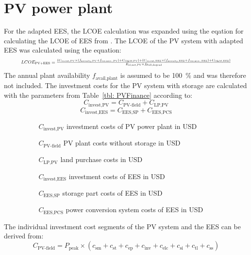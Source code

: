 \section{PV power plant}
For the adapted EES, the LCOE calculation was expanded using the eqation for calculating the LCOE of EES from \cite{Corcuera2015}. The LCOE of the PV system with adapted EES was calculated using the equation:  
\begin{equation}
\resizebox{0.9\textwidth}{!}{$LCOE_{\text{PV+EES}}=\frac{(C_{\text{invest,PV}}\times(f_{\text{annuity,PV}}+f_{\text{ins.ann.,PV}})+C_{\text{O\&M,PV}})+(C_{\text{invest,EES}}\times(f_{\text{annuity,EES}}+f_{\text{ins.ann.,EES}})+C_{\text{O\&M,EES}})}{E_{\text{el,net,PV}} \times f_{\text{Full,degrad}}}$}\label{eq:LCOE_PV}
\end{equation}
The annual plant availability $f_{\text{avail,plant}}$ is assumed to be 100~\% and was therefore not included. The investment costs for the PV system with storage are calculated with the parameters from Table~\ref{tbl: PVFinance} according to:
\begin{equation}
C_{\text{invest,PV}} = C_{\text{PV-field}}+C_{\text{LP,PV}}
\end{equation} 
\begin{equation}
C_{\text{invest,EES}} = C_{\text{EES,SP}}+C_{\text{EES,PCS}}
\end{equation} 
\begin{itemize}
\item[ ] 
\begin{itemize}
\item[ ] 
\begin{itemize}
\item[$C_{\text{invest,PV}}$]investment costs of PV power plant in USD
\item[$C_{\text{PV-field}}$]PV plant costs without storage in USD
\item[$C_{\text{LP,PV}}$]land purchase costs in USD
\item[$C_{\text{invest,EES}}$]investment costs of EES in USD
\item[$C_{\text{EES,SP}}$]storage part costs of EES in USD
\item[$C_{\text{EES,PCS}}$]power conversion system costs of EES in USD
\end{itemize}
\end{itemize}
\end{itemize}
The individual investment cost segments of the PV system and the EES can be derived from:
\begin{equation}
C_{\text{PV-field}} = P_{\text{peak}} \times (c_{\text{sm}}+c_{\text{st}}+c_{\text{ep}}+c_{\text{inv}}+c_{\text{elc}}+c_{\text{si}}+c_{\text{tl}}+c_{\text{ss}})
\end{equation} 
